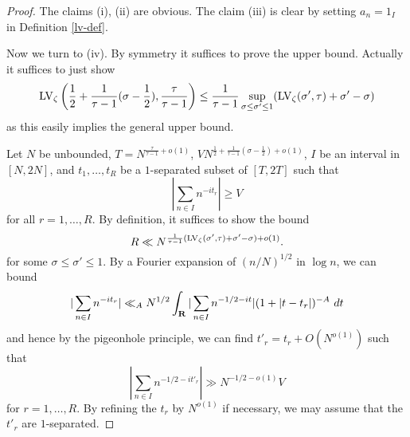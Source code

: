 \begin{proof}  The claims (i), (ii) are obvious.  The claim (iii) is clear by setting $a_n = 1_I$ in Definition \ref{lv-def}.

Now we turn to (iv).  By symmetry it suffices to prove the upper bound.  Actually it suffices to just show
$$ \mathrm{LV}_\zeta\left(\frac{1}{2} + \frac{1}{\tau-1} (\sigma-\frac{1}{2}), \frac{\tau}{\tau-1}\right) \leq \frac{1}{\tau-1} \sup_{\sigma \leq \sigma' \leq 1} (\mathrm{LV}_\zeta(\sigma',\tau) + \sigma'-\sigma)$$
as this easily implies the general upper bound.

Let $N$ be unbounded, $T= N^{\frac{\tau}{\tau-1}+o(1)}$, $V  N^{\frac{1}{2} + \frac{1}{\tau-1} (\sigma-\frac{1}{2})+o(1)}$, $I$ be an interval in $[N,2N]$, and $t_1,\dots,t_R$ be a $1$-separated subset of $[T,2T]$ such that
$$ |\sum_{n \in I} n^{-it_r}| \geq V$$
for all $r=1,\dots,R$. By definition, it suffices to show the bound
\begin{equation}\label{r-targ}
    R \ll N^{\frac{1}{\tau-1} (\mathrm{LV}_\zeta(\sigma',\tau) + \sigma'-\sigma)+o(1)}.
\end{equation}
for some $\sigma \leq \sigma' \leq 1$.
By a Fourier expansion of $(n/N)^{1/2}$ in $\log n$, we can bound
$$ |\sum_{n \in I} n^{-it_r}| \ll_A N^{1/2} \int_\R |\sum_{n \in I} n^{-1/2-it}| (1 + |t-t_r|)^{-A}\ dt$$
and hence by the pigeonhole principle, we can find $t'_r = t_r + O(N^{o(1)})$ such that
$$ |\sum_{n \in I} n^{-1/2-it'_r}| \gg N^{-1/2-o(1)} V$$
for $r=1,\dots,R$.  By refining the $t_r$ by $N^{o(1)}$ if necessary, we may assume that the $t'_r$ are $1$-separated.


\end{proof}
